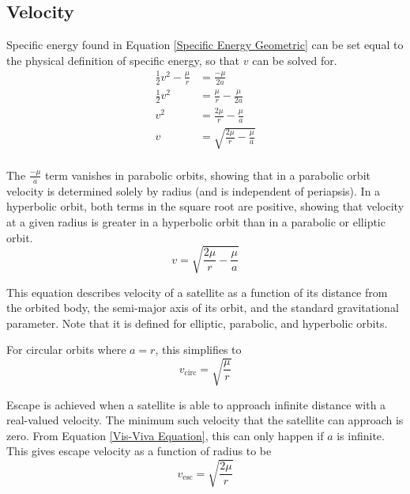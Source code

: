 \documentclass[../main.tex]{subfiles}
\begin{document}
\bigskip\bigskip
\subsection{Velocity}\label{sec:Velocity}

Specific energy found in Equation \eqref{Specific Energy Geometric} can be set equal to the physical definition of specific energy, so that $v$ can be solved for.
\begin{align*}
    \frac{1}{2}v^2-\frac{\mu}{r} & =\frac{-\mu}{2a}                     \\
    \frac{1}{2}v^2               & =\frac{\mu}{r}-\frac{\mu}{2a}        \\
    v^2                          & =\frac{2\mu}{r}-\frac{\mu}{a}        \\
    v                            & =\sqrt{\frac{2\mu}{r}-\frac{\mu}{a}} \\
\end{align*}

The $\frac{-\mu}{a}$ term vanishes in parabolic orbits, showing that in a parabolic orbit velocity is determined solely by radius (and is independent of periapsis). In a hyperbolic orbit, both terms in the square root are positive, showing that velocity at a given radius is greater in a hyperbolic orbit than in a parabolic or elliptic orbit.
\begin{equation}\label{Vis-Viva Equation}
    v= \sqrt{\frac{2\mu}{r}-\frac{\mu}{a}}
\end{equation}

This equation describes velocity of a satellite as a function of its distance from the orbited body, the semi-major axis of its orbit, and the standard gravitational parameter. Note that it is defined for elliptic, parabolic, and hyperbolic orbits.

For circular orbits where $a=r$, this simplifies to
\begin{equation}\label{Circular Velocity}
    v_\text{circ} = \sqrt{\frac{\mu}{r}}
\end{equation}

Escape is achieved when a satellite is able to approach infinite distance with a real-valued velocity. The minimum such velocity that the satellite can approach is zero. From Equation \eqref{Vis-Viva Equation}, this can only happen if $a$ is infinite. This gives escape velocity as a function of radius to be
\begin{equation}\label{Escape velocity}
    v_\text{esc}=\sqrt{\frac{2\mu}{r}}
\end{equation}
\end{document}
